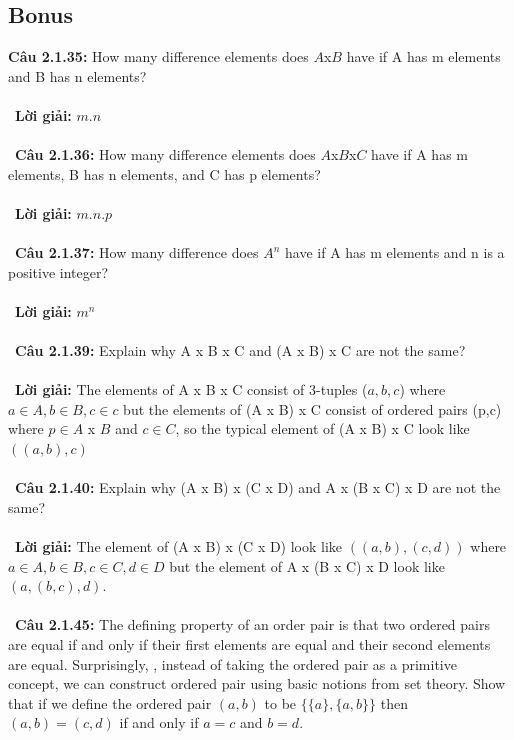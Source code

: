 \documentclass[a4paper]{article}
\begin{document}
\subsection{Bonus}
\textbf{Câu 2.1.35: } How many difference elements does $A$x$B$ have if A has m elements and B has n elements? \\\ \\\
\textbf{Lời giải:} $m.n$ \\\ \\\
\textbf{Câu 2.1.36: } How many difference elements does $A$x$B$x$C$ have if A has m elements, B has n elements, and C has p elements?
 \\\ \\\
\textbf{Lời giải:} $m.n.p$ \\\ \\\
\textbf{Câu 2.1.37: } How many difference does $A^{n}$ have if A has m elements and n is a positive integer? \\\ \\\
\textbf{Lời giải:}  $m^{n}$ \\\ \\\
\textbf{Câu 2.1.39: }  Explain why A x B x C and (A x B) x C are not the same?
 \\\ \\\
\textbf{Lời giải:} The elements of A x B x C consist of 3-tuples ($a,b,c$) where $a \in A, b \in B, c\in c$ but the elements of (A x B) x C consist of ordered pairs (p,c) where $p \in A$ x $B$ and $c \in C$, so the typical element of (A x B) x C look like $((a,b),c)$ \\\ \\\
\textbf{Câu 2.1.40: } Explain why (A x B) x (C x D) and A x (B x C) x D are not the same? \\\ \\\
\textbf{Lời giải:} The element of (A x B) x (C x D) look like $((a,b),(c,d))$ where $a \in A, b \in B, c \in C, d \in D$ but the element of A x (B x C) x D look like $(a,(b,c),d)$. \\\ \\\
\textbf{Câu 2.1.45: } The defining property of an order pair is that two ordered pairs are equal if and only if their first elements  are equal and their second elements are equal. Surprisingly, , instead of taking the ordered pair as a primitive concept, we can construct ordered pair using basic notions from set theory. Show that if we define  the ordered pair $(a,b)$ to be $\{\{a\},\{a,b\}\}$ then $(a,b)=(c,d)$ if and only if $a=c$ and $b=d$.    \\\ \\\
\end{document}
